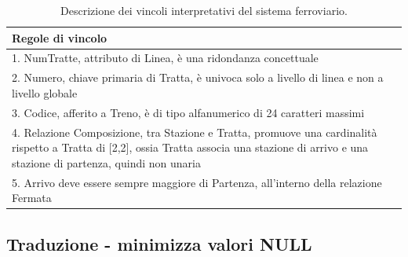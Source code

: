 \documentclass{article}
\begin{document}
\begin{table}[ht]
    \centering
    \begin{tabular}{|p{12cm}|}
        \hline
        Regole di vincolo \\
        \hline
        1. NumTratte, attributo di Linea, è una ridondanza concettuale \\
        \hline
        2. Numero, chiave primaria di Tratta, è univoca solo a livello di linea e non a livello globale \\
        \hline
        3. Codice, afferito a Treno, è di tipo alfanumerico di 24 caratteri massimi \\
        \hline
        4. Relazione Composizione, tra Stazione e Tratta, promuove una cardinalità rispetto a Tratta di [2,2], ossia Tratta associa una stazione di arrivo e una stazione di partenza, quindi non unaria \\
        \hline
        5. Arrivo deve essere sempre maggiore di Partenza, all'interno della relazione Fermata \\
        \hline
    \end{tabular}
    \caption{Descrizione dei vincoli interpretativi del sistema ferroviario.}
\end{table}

\pagebreak
\subsection*{Traduzione - minimizza valori NULL}
\large
\end{document}

